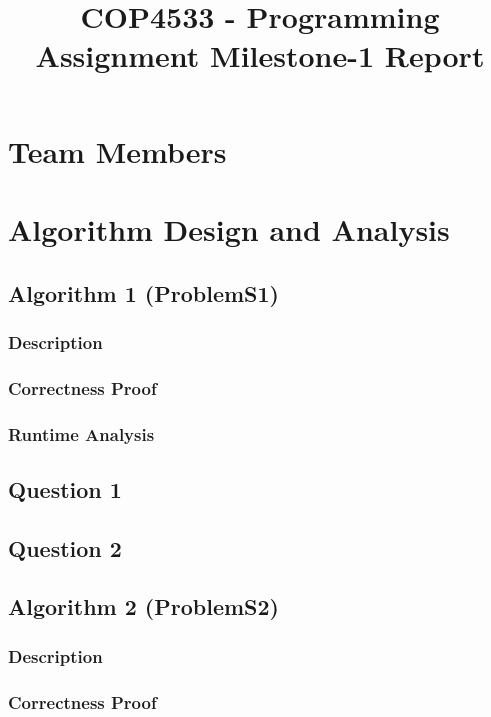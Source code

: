 \documentclass{article}
\begin{document}
\title{COP4533 - Programming Assignment Milestone-1 Report}
\date{}
\maketitle

\section{Team Members}

\section{Algorithm Design and Analysis}

\subsection{Algorithm 1 (ProblemS1)}

\subsubsection{Description}

\subsubsection{Correctness Proof}

\subsubsection{Runtime Analysis}

\subsection{Question 1}

\subsection{Question 2}

\subsection{Algorithm 2 (ProblemS2)}

\subsubsection{Description}

\subsubsection{Correctness Proof}
\end{document}

